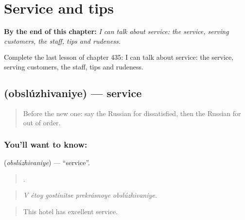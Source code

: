 
\chapter{Service and tips}
\label{ch:ru-service-and-tips}

\begin{chapteropening}
\textbf{By the end of this chapter:} \emph{I can talk about service: the service, serving customers, the staff, tips and rudeness.}

Complete the last lesson of chapter 435: I can talk about service: the service, serving customers, the staff, tips and rudeness.
\end{chapteropening}

\section[\texorpdfstring{\ru{обслуживание} (obslúzhivaniye)}{обслуживание (obslúzhivaniye)}]{ (obslúzhivaniye) — service}

\label{lesson:RU-C435-obsluzhivaniye}



\begin{quote}
Before the new one: say the Russian for dissatisfied, then the Russian for out of order.
\end{quote}

\subsection*{You'll want to know: }
\textbf{} (\emph{obslúzhivaniye}) — \textquotedblleft{}service\textquotedblright{}.

\begin{quote}
    .
\end{quote}

\begin{quote}
\emph{V étoy gostínitse prekrásnoye obslúzhivaniye.}
\end{quote}

\begin{quote}
This hotel has excellent service.
\end{quote}

